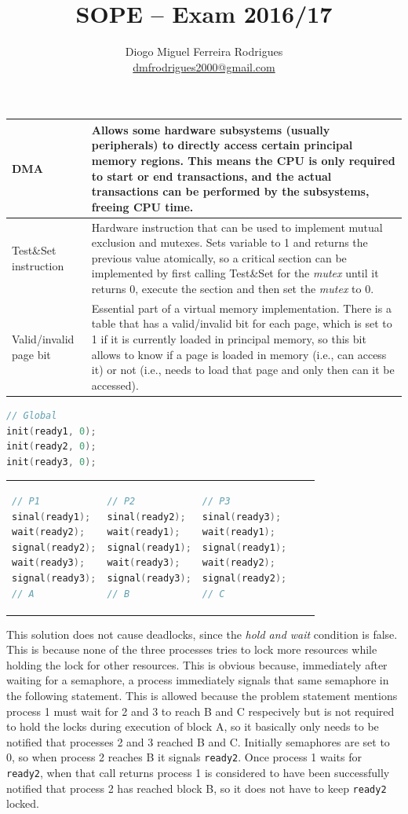 \documentclass{sope}
\title{SOPE -- Exam 2016/17}
\author{Diogo Miguel Ferreira Rodrigues \\ \href{mailto:dmfrodrigues2000@gmail.com}{dmfrodrigues2000@gmail.com}}
\begin{document}
\setcounter{chapter}{16}
\begin{tabular}{p{29mm} | p{122mm}}
    DMA & Allows some hardware subsystems (usually peripherals) to directly access certain principal memory regions. This means the CPU is only required to start or end transactions, and the actual transactions can be performed by the subsystems, freeing CPU time. \\ \hline
    Test\&Set instruction & Hardware instruction that can be used to implement mutual exclusion and mutexes. Sets variable to 1 and returns the previous value atomically, so a critical section can be implemented by first calling Test\&Set for the \emph{mutex} until it returns 0, execute the section and then set the \emph{mutex} to 0. \\ \hline
    Valid/invalid page bit & Essential part of a virtual memory implementation. There is a table that has a valid/invalid bit for each page, which is set to 1 if it is currently loaded in principal memory, so this bit allows to know if a page is loaded in memory (i.e., can access it) or not (i.e., needs to load that page and only then can it be accessed).
\end{tabular}

\begin{lstlisting}[language=C]
// Global
init(ready1, 0);
init(ready2, 0);
init(ready3, 0);
\end{lstlisting}
\begin{tabular}{p{49mm} p{49mm} p{49mm}}
    \begin{lstlisting}[language=C]
// P1
sinal(ready1);
wait(ready2);
signal(ready2);
wait(ready3);
signal(ready3);
// A    
    \end{lstlisting} &
    \begin{lstlisting}[language=C]
// P2
sinal(ready2);
wait(ready1);
signal(ready1);
wait(ready3);
signal(ready3);
// B    
    \end{lstlisting} &
    \begin{lstlisting}[language=C]
// P3
sinal(ready3);
wait(ready1);
signal(ready1);
wait(ready2);
signal(ready2);    
// C
    \end{lstlisting}
\end{tabular}

This solution does not cause deadlocks, since the \emph{hold and wait} condition is false. This is because none of the three processes tries to lock more resources while holding the lock for other resources. This is obvious because, immediately after waiting for a semaphore, a process immediately signals that same semaphore in the following statement. This is allowed because the problem statement mentions process 1 must wait for 2 and 3 to reach B and C respecively but is not required to hold the locks during execution of block A, so it basically only needs to be notified that processes 2 and 3 reached B and C. Initially semaphores are set to 0, so when process 2 reaches B it signals \texttt{ready2}. Once process 1 waits for \texttt{ready2}, when that call returns process 1 is considered to have been successfully notified that process 2 has reached block B, so it does not have to keep \texttt{ready2} locked.
\end{document}

